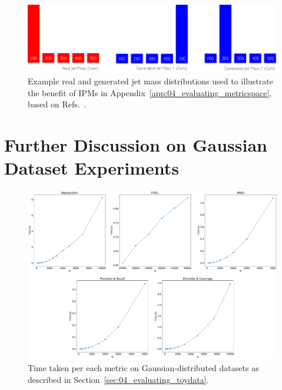 \begin{figure}[htpb]
    \includegraphics[width=\textwidth]{figures/04-ML4Sim/evaluating/metricspace.pdf}
    \caption{Example real and generated jet mass distributions used to illustrate the benefit of IPMs in Appendix~\ref{app:04_evaluating_metricspace}, based on Refs.~\cite{gretton_talk, w1_stackoverflow}.}
    \label{fig:04_evaluating_metricspace}
\end{figure}

\section{Further Discussion on Gaussian Dataset Experiments}
\label{app:04_evaluating_details}

\begin{figure}[htpb]
    \centering
    \includegraphics[width=\textwidth]{figures/04-ML4Sim/evaluating/timings.pdf}
    \caption{Time taken per each metric on Gaussian-distributed datasets as described in Section~\ref{sec:04_evaluating_toydata}.}
    \label{fig:04_evaluating_timings}
\end{figure}

